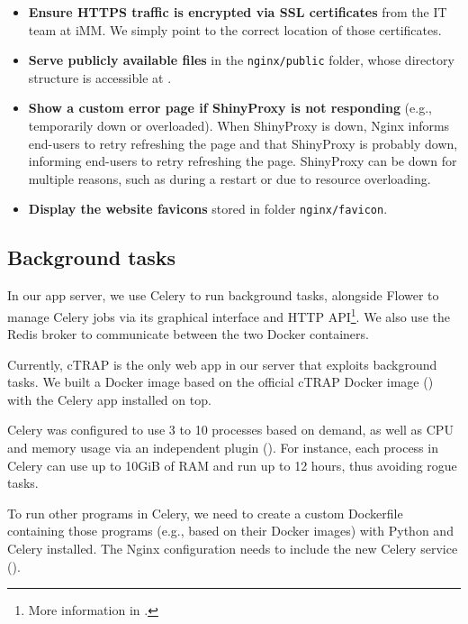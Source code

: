 \begin{itemize}
	\item \textbf{Ensure HTTPS traffic is encrypted via SSL certificates} from the IT team at iMM. We simply point to the correct location of those certificates.%
	\item \textbf{Serve publicly available files} in the \texttt{nginx/public} folder, whose directory structure is accessible at .
	\item \textbf{Show a custom error page if ShinyProxy is not responding} (e.g., temporarily down or overloaded). When ShinyProxy is down, Nginx informs end-users to retry refreshing the page and that ShinyProxy is probably down, informing end-users to retry refreshing the page. ShinyProxy can be down for multiple reasons, such as during a restart or due to resource overloading. %
	\item \textbf{Display the website favicons} stored in folder \texttt{nginx/favicon}.
\end{itemize}

\subsection{Background tasks}
\label{sec:background-tasks}

In our app server, we use Celery to run background tasks, alongside Flower to manage Celery jobs via its graphical interface and HTTP API\footnote{More information in .}. We also use the Redis broker to communicate between the two Docker containers.

Currently, cTRAP is the only web app in our server that exploits background tasks. We built a Docker image based on the official cTRAP Docker image () with the Celery app installed on top.

Celery was configured to use 3 to 10 processes based on demand, as well as CPU and memory usage via an independent plugin (). For instance, each process in Celery can use up to 10GiB of RAM and run up to 12 hours, thus avoiding rogue tasks.

To run other programs in Celery, we need to create a custom Dockerfile containing those programs (e.g., based on their Docker images) with Python and Celery installed. The Nginx configuration needs to include the new Celery service ().

